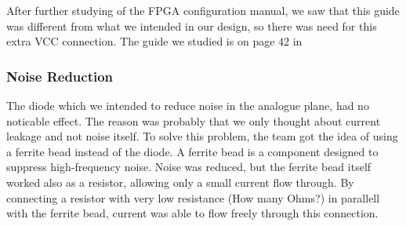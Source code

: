 After further studying of the FPGA configuration manual, we saw that this guide was different from what we intended in our design, so there was need for this extra VCC connection. The guide we studied is on page 42 in \cite{fpga-configuration}

\subsubsection{Noise Reduction}
The diode which we intended to reduce noise in the analogue plane, had no noticable effect. The reason was probably that we only thought about current leakage and not noise itself. To solve this problem, the team got the idea of using a ferrite bead instead of the diode. A ferrite bead is a component designed to suppress high-frequency noise. 
\newline
Noise was reduced, but the ferrite bead itself worked also as a resistor, allowing only a small current flow through. By connecting a resistor with very low resistance (How many Ohms?) in parallell with the ferrite bead, current was able to flow freely through this connection.